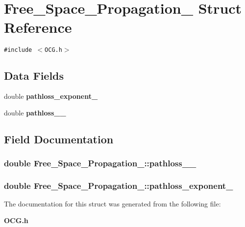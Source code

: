 \section{Free\_\-Space\_\-Propagation\_\- Struct Reference}
\label{structFree__Space__Propagation__}
{\tt \#include $<$OCG.h$>$}

\subsection*{Data Fields}
\begin{CompactItemize}
\item 
double {\bf pathloss\_\-exponent\_\-}
\item 
double {\bf pathloss\_\_\-}
\end{CompactItemize}


\subsection{Field Documentation}
\subsubsection[{pathloss\_\-0\_\-}]{\setlength{\rightskip}{0pt plus 5cm}double {\bf Free\_\-Space\_\-Propagation\_\-::pathloss\_\_\-}}\label{structFree__Space__Propagation___7e6c52589f8365d2cd103cd3e5e966c8}


\subsubsection[{pathloss\_\-exponent\_\-}]{\setlength{\rightskip}{0pt plus 5cm}double {\bf Free\_\-Space\_\-Propagation\_\-::pathloss\_\-exponent\_\-}}\label{structFree__Space__Propagation___d59f468a4a126f3d1f203800b80f1959}




The documentation for this struct was generated from the following file:\begin{CompactItemize}
\item 
{\bf OCG.h}\end{CompactItemize}
